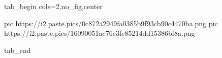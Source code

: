 
 
 
 
 


\ifcmt
  tab_begin cols=2,no_fig,center

     pic https://i2.paste.pics/0c872a2949fa0385b9f93cb90c4470ba.png
		 pic https://i2.paste.pics/16090051ac76e3fe85214dd15386bf8a.png

  tab_end
\fi
